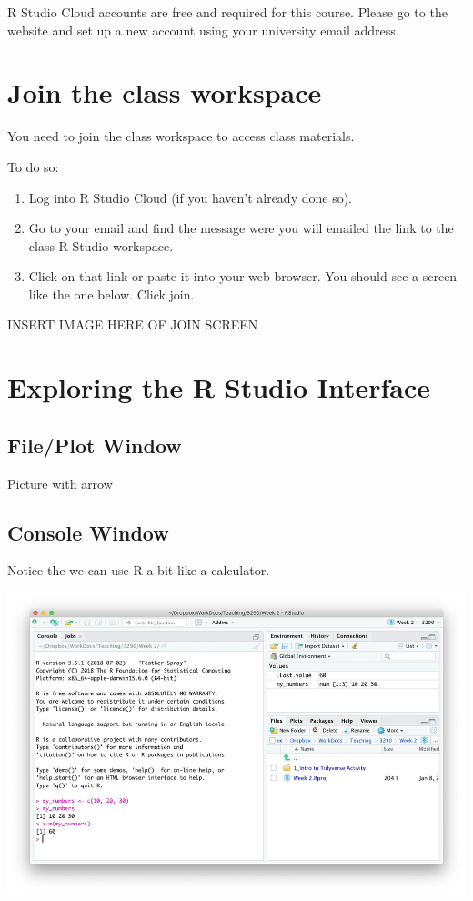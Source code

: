 \documentclass[
]{krantz}
\providecommand{\tightlist}{%
  \setlength{\itemsep}{0pt}\setlength{\parskip}{0pt}}
\begin{document}
R Studio Cloud accounts are free and required for this course. Please go to the website and set up a new account using your university email address.

\hypertarget{join-the-class-workspace}{%
\section{Join the class workspace}\label{join-the-class-workspace}}

You need to join the class workspace to access class materials.

To do so:

\begin{enumerate}
\def\labelenumi{\arabic{enumi}.}
\tightlist
\item
  Log into R Studio Cloud (if you haven't already done so).
\item
  Go to your email and find the message were you will emailed the link to the class R Studio workspace.
\item
  Click on that link or paste it into your web browser. You should see a screen like the one below. Click join.
\end{enumerate}

INSERT IMAGE HERE OF JOIN SCREEN

\hypertarget{exploring-the-r-studio-interface}{%
\section{Exploring the R Studio Interface}\label{exploring-the-r-studio-interface}}

\hypertarget{fileplot-window}{%
\subsection{File/Plot Window}\label{fileplot-window}}

Picture with arrow

\hypertarget{console-window}{%
\subsection{Console Window}\label{console-window}}

Notice the we can use R a bit like a calculator.

\includegraphics[width=1\linewidth]{first_time/images/console}
\end{document}
